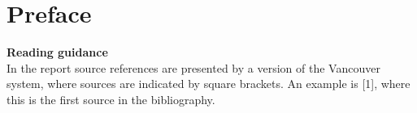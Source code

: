 \chapter*{Preface}

\textbf{Reading guidance}\\


In the report source references are presented by a version of the Vancouver system, where sources are indicated by square brackets. An example is [1], where this is the first source in the bibliography.


\begin{multicols}{2}
\signature{Oliver B. Købsted}
\signature{Anders L. Matthiassen}
\signature{Jacob Nielsen}
\signature{Simon A. Pedersen}
\end{multicols}